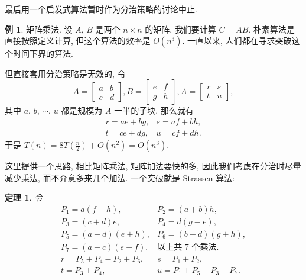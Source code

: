 \documentclass[a4paper]{ctexart}
\newtheorem{theorem}{定理}
\theoremstyle{definition}
\theoremstyle{definition}
\newtheorem{example}{例}[section]
\begin{document}
最后用一个启发式算法暂时作为分治策略的讨论中止. 

\begin{example}
  矩阵乘法. 设 $A$, $B$ 是两个 $n \times n$ 的矩阵, 我们要计算 $C = AB$.
  朴素算法是直接按照定义计算, 但这个算法的效率是 $O(n^3)$. 一直以来, 人们都在寻求突破这个时间下界的算法.
\end{example}

但直接套用分治策略是无效的, 令
\begin{equation}
  A = \left[
    \begin{array}{cc}
      a & b \\
      c & d
    \end{array}
  \right], 
  B = \left[
    \begin{array}{cc}
      e & f \\
      g & h
    \end{array}
  \right], 
  A = \left[
    \begin{array}{cc}
      r & s \\
      t & u 
    \end{array}
  \right], 
\end{equation}
其中 $a$, $b$, $\cdots$, $u$ 都是规模为 $A$ 一半的子块. 那么就有
\begin{equation}
  \begin{array}{ll}
    r = a e + b g, & s = a f + b h, \\
    t = c e + d g, & u = c f + d h.
  \end{array}
\end{equation}
于是 $T(n) = 8 T(\frac{n}{2}) + O(n^2) = O(n^3)$.

这里提供一个思路, 相比矩阵乘法, 矩阵加法要快的多, 因此我们考虑在分治时尽量减少乘法, 而不介意多来几个加法. 
一个突破就是 Strassen 算法: 

\begin{theorem}
  令 
  \begin{equation}
    \begin{array}{ll}
      P_1 = a(f - h), & P_2 = (a + b) h, \\
      P_3 = (c + d) e, & P_4 = d(g - e), \\
      P_5 = (a + d)(e + h), & P_6 = (b - d)(g + h), \\
      P_7 = (a - c)(e + f). & \mbox{以上共 $7$ 个乘法}. \\
      r = P_5 + P_4 - P_2 + P_6, & s = P_1 + P_2, \\
      t = P_3 + P_4, & u = P_1 + P_5 - P_3 - P_7.
    \end{array}
  \end{equation}
\end{theorem}
\end{document}
